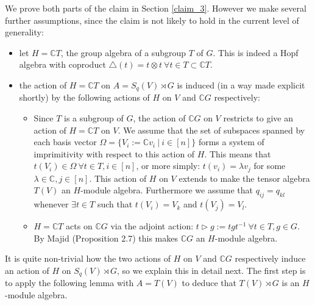 \documentclass[10pt]{article}
\newcommand{\nt}{\noindent}
\newcommand{\Cc }{\mathbb{C}}
\theoremstyle{definition}
\begin{document}
\nt We prove both parts of the claim in Section \ref{claim_3}. However we make several further assumptions, since the claim is not likely to hold in the current level of generality:
\begin{itemize}
   \item let $H=\Cc  T$, the group algebra of a subgroup $T$ of $G$. This is indeed a Hopf algebra with coproduct $\triangle(t)=t\otimes t\ \forall t\in T\subset \Cc  T$. 
   
   \item the action of $H=\Cc  T$ on $A=S_q(V)\rtimes G$ is induced (in a way made explicit shortly) by the following actions of $H$ on $V$ and $\Cc  G$ respectively: 
   \begin{itemize}
      \item Since $T$ is a subgroup of $G$, the action of $\Cc  G$ on $V$ restricts to give an action of $H=\Cc  T$ on $V$. We assume that the set of subspaces spanned by each basis vector $\Omega=\{V_i:=\Cc  v_i\ |\ i\in [n]\}$ forms a system of imprimitivity with respect to this action of $H$. This means that $t(V_i)\in \Omega\ \forall t\in T, i\in [n]$, or more simply: $t(v_i)=\lambda v_j$ for some $\lambda\in \Cc , j\in [n]$. This action of $H$ on $V$ extends to make the tensor algebra $T(V)$ an $H$-module algebra. Furthermore we assume that $q_{ij}=q_{kl}$ whenever $\exists t\in T$ such that $t(V_i)=V_k$ and $t(V_j)=V_l$. 

      \item $H=\Cc  T$ acts on $\Cc  G$ via the adjoint action: $t\rhd g:=tgt^{-1}\ \forall t\in T,g\in G$. By Majid \cite{alma9916633704401631} (Proposition 2.7) this makes $\Cc  G$ an $H$-module algebra.
   \end{itemize}
\end{itemize}

\nt It is quite non-trivial how the two actions of $H$ on $V$ and $\Cc  G$ respectively induce an action of $H$ on $S_q(V)\rtimes G$, so we explain this in detail next. The first step is to apply the following lemma with $A=T(V)$ to deduce that $T(V)\rtimes G$ is an $H$-module algebra.
\end{document}

